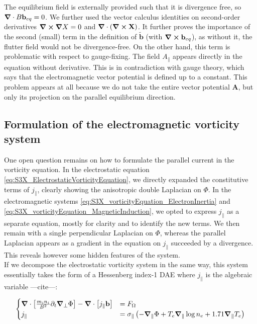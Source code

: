 The equilibrium field is externally provided such that it is divergence free, so $\grad\cdot B\mathbf{b}_{eq} = 0$. We further used the vector calculus identities on second-order derivatives $\grad\cross\grad X = 0$ and $\grad\cdot\left(\grad\cross\mathbf{X}\right)$. It further proves the importance of the second (small) term in the definition of $\mathbf{\tilde{b}}$ (with $\grad\cross\mathbf{b}_{eq}$), as without it, the flutter field would not be divergence-free. On the other hand, this term is problematic with respect to gauge-fixing. The field $A_\parallel$ appears directly in the equation without derivative. This is in contradiction with gauge theory, which says that the electromagnetic vector potential is defined up to a constant. This problem appears at all because we do not take the entire vector potential $\textbf{A}$, but only its projection on the parallel equilibrium direction. 


\subsection{Formulation of the electromagnetic vorticity system}
\label{sec:S3X_formulationEMsystem}

One open question remains on how to formulate the parallel current in the vorticity equation. In the electrostatic equation \ref{eq:S3X_ElectrostaticVorticityEquation}, we directly expanded the constitutive terms of $j_\parallel$, clearly showing the anisotropic double Laplacian on $\Phi$. In the electromagnetic systems \ref{eq:S3X_vorticityEquation_ElectronInertia} and \ref{eq:S3X_vorticityEquation_MagneticInduction}, we opted to express $j_\parallel$ as a separate equation, mostly for clarity and to identify the new terms. We then remain with a single perpendicular Laplacian on $\Phi$, whereas the parallel Laplacian appears as a gradient in the equation on $j_\parallel$ succeeded by a divergence. This reveals however some hidden features of the system. \\

If we decompose the electrostatic vorticity system in the same way, this system essentially takes the form of a Hessenberg index-1 DAE where $j_\parallel$ is the algebraic variable ---cite---:

\begin{align}
	\begin{cases}
		\grad\cdot\left[\frac{m_i n_i}{ B^2}\partial_t\grad_\perp\Phi\right] - \grad\cdot\left[j_\parallel\mathbf{b}\right]& = F_\Omega \\
		j_\parallel& = \sigma_\parallel \left(-\grad_\parallel\Phi + T_e\grad_\parallel\log n_e + 1.71\grad_\parallel T_e \right)
	\end{cases}
\end{align}

